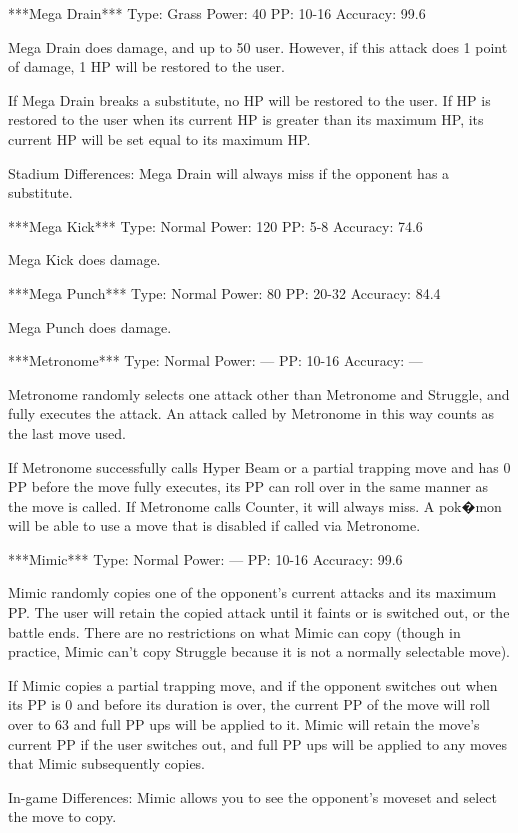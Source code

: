 \documentclass[reprint, aps, prl, paper=A4]{revtex4-1}
\begin{document}
***Mega Drain***
Type: Grass
Power: 40
PP: 10-16
Accuracy: 99.6%

Mega Drain does damage, and up to 50%
user. However, if this attack does 1 point of damage, 1 HP will be restored to the user.

If Mega Drain breaks a substitute, no HP will be restored to the user. If HP is restored to the
user when its current HP is greater than its maximum HP, its current HP will be set equal to
its maximum HP.

Stadium Differences:
Mega Drain will always miss if the opponent has a substitute.


***Mega Kick***
Type: Normal
Power: 120
PP: 5-8
Accuracy: 74.6%

Mega Kick does damage.


***Mega Punch***
Type: Normal
Power: 80
PP: 20-32
Accuracy: 84.4%

Mega Punch does damage.


***Metronome***
Type: Normal
Power: ---
PP: 10-16
Accuracy: ---

Metronome randomly selects one attack other than Metronome and Struggle, and fully executes the
attack. An attack called by Metronome in this way counts as the last move used.

If Metronome successfully calls Hyper Beam or a partial trapping move and has 0 PP before the
move fully executes, its PP can roll over in the same manner as the move is called. If
Metronome calls Counter, it will always miss. A pok�mon will be able to use a move that is
disabled if called via Metronome.


***Mimic***
Type: Normal
Power: ---
PP: 10-16
Accuracy: 99.6%

Mimic randomly copies one of the opponent's current attacks and its maximum PP. The user will
retain the copied attack until it faints or is switched out, or the battle ends. There are no
restrictions on what Mimic can copy (though in practice, Mimic can't copy Struggle because it
is not a normally selectable move).

If Mimic copies a partial trapping move, and if the opponent switches out when its PP is 0 and
before its duration is over, the current PP of the move will roll over to 63 and full PP ups
will be applied to it. Mimic will retain the move's current PP if the user switches out, and
full PP ups will be applied to any moves that Mimic subsequently copies.

In-game Differences:
Mimic allows you to see the opponent's moveset and select the move to copy.
\end{document}
